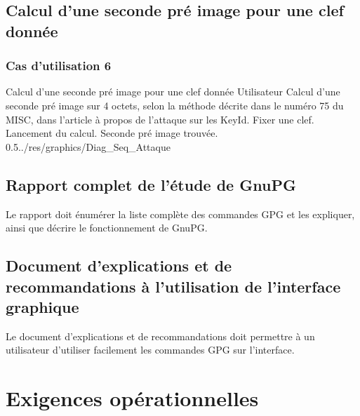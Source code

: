\documentclass{../res/univ-projet}
\begin{document}
\subsection{Calcul d'une seconde pré image pour une clef donnée}
  
\subsubsection{Cas d'utilisation 6}
\ficheGraphic
{Calcul d'une seconde pré image pour une clef donnée}
{Utilisateur}
{Calcul d'une seconde pré image sur 4 octets, selon la méthode décrite dans le numéro 75 du MISC, dans l'article à propos de l'attaque sur les KeyId.}
{Fixer une clef.}
{Lancement du calcul.}
{Seconde pré image trouvée.}
{0.5}{../res/graphics/Diag_Seq_Attaque}
{}
\vspace{0.5cm}


\subsection{Rapport complet de l'étude de GnuPG}

Le rapport doit énumérer la liste complète des commandes GPG et les expliquer, ainsi que décrire le fonctionnement de GnuPG.


\subsection{Document d'explications et de recommandations à l'utilisation de l'interface graphique}

Le document d'explications et de recommandations doit permettre à un utilisateur d'utiliser facilement les commandes GPG sur l'interface.

\newpage

\section{Exigences opérationnelles}
\end{document}
